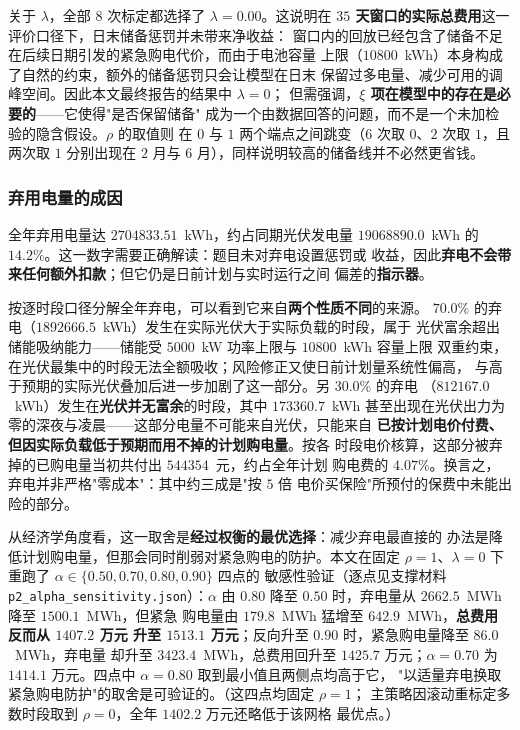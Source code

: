 \documentclass[withoutpreface,bwprint]{cumcmthesis}
\begin{document}
关于 $\lambda$，全部 $8$ 次标定都选择了 $\lambda=0.00$。这说明在
\textbf{$35$ 天窗口的实际总费用}这一评价口径下，日末储备惩罚并未带来净收益：
窗口内的回放已经包含了储备不足在后续日期引发的紧急购电代价，而由于电池容量
上限（$10800$~kWh）本身构成了自然的约束，额外的储备惩罚只会让模型在日末
保留过多电量、减少可用的调峰空间。因此本文最终报告的结果中 $\lambda=0$；
但需强调，\textbf{$\xi$ 项在模型中的存在是必要的}——它使得"是否保留储备"
成为一个由数据回答的问题，而不是一个未加检验的隐含假设。$\rho$ 的取值则
在 $0$ 与 $1$ 两个端点之间跳变（$6$ 次取 $0$、$2$ 次取 $1$，且两次取 $1$
分别出现在 $2$ 月与 $6$ 月），同样说明较高的储备线并不必然更省钱。

\subsubsection{弃用电量的成因}

全年弃用电量达 $2704833.51$~kWh，约占同期光伏发电量
$19068890.0$~kWh 的 $14.2\%$。这一数字需要正确解读：题目未对弃电设置惩罚或
收益，因此\textbf{弃电不会带来任何额外扣款}；但它仍是日前计划与实时运行之间
偏差的\textbf{指示器}。

按逐时段口径分解全年弃电，可以看到它来自\textbf{两个性质不同}的来源。
$70.0\%$ 的弃电（$1892666.5$~kWh）发生在实际光伏大于实际负载的时段，属于
光伏富余超出储能吸纳能力——储能受 $5000$~kW 功率上限与 $10800$~kWh 容量上限
双重约束，在光伏最集中的时段无法全额吸收；风险修正又使日前计划量系统性偏高，
与高于预期的实际光伏叠加后进一步加剧了这一部分。另 $30.0\%$ 的弃电
（$812167.0$~kWh）发生在\textbf{光伏并无富余}的时段，其中 $173360.7$~kWh
甚至出现在光伏出力为零的深夜与凌晨——这部分电量不可能来自光伏，只能来自
\textbf{已按计划电价付费、但因实际负载低于预期而用不掉的计划购电量}。按各
时段电价核算，这部分被弃掉的已购电量当初共付出 $544354$~元，约占全年计划
购电费的 $4.07\%$。换言之，弃电并非严格"零成本"：其中约三成是"按 $5$ 倍
电价买保险"所预付的保费中未能出险的部分。

从经济学角度看，这一取舍是\textbf{经过权衡的最优选择}：减少弃电最直接的
办法是降低计划购电量，但那会同时削弱对紧急购电的防护。本文在固定
$\rho=1$、$\lambda=0$ 下重跑了 $\alpha\in\{0.50,0.70,0.80,0.90\}$ 四点的
敏感性验证（逐点见支撑材料 \texttt{p2\_alpha\_sensitivity.json}）：$\alpha$
由 $0.80$ 降至 $0.50$ 时，弃电量从 $2662.5$~MWh 降至 $1500.1$~MWh，但紧急
购电量由 $179.8$~MWh 猛增至 $642.9$~MWh，\textbf{总费用反而从 $1407.2$ 万元
升至 $1513.1$ 万元}；反向升至 $0.90$ 时，紧急购电量降至 $86.0$~MWh，弃电量
却升至 $3423.4$~MWh，总费用回升至 $1425.7$ 万元；$\alpha=0.70$ 为
$1414.1$ 万元。四点中 $\alpha=0.80$ 取到最小值且两侧点均高于它，
"以适量弃电换取紧急购电防护"的取舍是可验证的。（这四点均固定 $\rho=1$；
主策略因滚动重标定多数时段取到 $\rho=0$，全年 $1402.2$ 万元还略低于该网格
最优点。）
\end{document}
